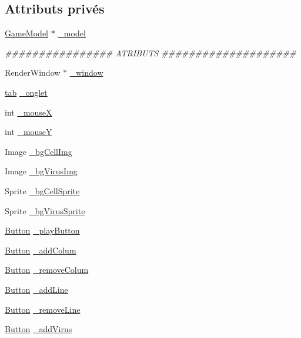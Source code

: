 \subsection*{Attributs privés}
\begin{DoxyCompactItemize}
\item 
\hyperlink{classGameModel}{GameModel} $\ast$ \hyperlink{classMenuView_aacb048b144e056ac0b99569fbaef6ac2}{\_\-model}
\begin{DoxyCompactList}\small\item\em \#\#\#\#\#\#\#\#\#\#\#\#\#\#\#\# ATRIBUTS \#\#\#\#\#\#\#\#\#\#\#\#\#\#\#\#\#\#\#\# \end{DoxyCompactList}\item 
RenderWindow $\ast$ \hyperlink{classMenuView_a038a98b254b2c5b95217f0effbe0e289}{\_\-window}
\item 
\hyperlink{enum_8h_af1ffd7c07d3cf727dfbec1ee327606fa}{tab} \hyperlink{classMenuView_a9fcfd5b227056bc52359edb248289e7a}{\_\-onglet}
\item 
int \hyperlink{classMenuView_a5fac451fc6c45479926b8b00865e38ad}{\_\-mouseX}
\item 
int \hyperlink{classMenuView_a522046f53c6f43686f3dd25193a2e795}{\_\-mouseY}
\item 
Image \hyperlink{classMenuView_a9d00738baf5ed7a58e19b9e233636914}{\_\-bgCellImg}
\item 
Image \hyperlink{classMenuView_ad24381fdd0cdfb7585bbace523ca7b17}{\_\-bgVirusImg}
\item 
Sprite \hyperlink{classMenuView_a74e92f938b434a54229f4fa81e803fb7}{\_\-bgCellSprite}
\item 
Sprite \hyperlink{classMenuView_aaadb330dbaf71ca086ecdc49462ce285}{\_\-bgVirusSprite}
\item 
\hyperlink{classButton}{Button} \hyperlink{classMenuView_a52424a068656749a098f0a46f3bcb81e}{\_\-playButton}
\item 
\hyperlink{classButton}{Button} \hyperlink{classMenuView_ab437e4727d8381964fa7a0d584ac17b8}{\_\-addColum}
\item 
\hyperlink{classButton}{Button} \hyperlink{classMenuView_a5bd024bb7d464417c65087c2e28441d7}{\_\-removeColum}
\item 
\hyperlink{classButton}{Button} \hyperlink{classMenuView_a77db02321d1e42439bd61528a14fd5b2}{\_\-addLine}
\item 
\hyperlink{classButton}{Button} \hyperlink{classMenuView_ac60ae85c296f4acd1bd92b0156e4dc33}{\_\-removeLine}
\item 
\hyperlink{classButton}{Button} \hyperlink{classMenuView_ab34b59aaa6955c9b2e5fae146be8221f}{\_\-addVirus}

\end{DoxyCompactItemize}
